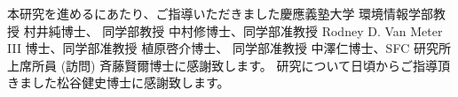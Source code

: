 \begin{acknowledgment}

本研究を進めるにあたり、ご指導いただきました慶應義塾大学 環境情報学部教授 村井純博士、
同学部教授 中村修博士、同学部准教授 Rodney D. Van Meter III 博士、同学部准教授 植原啓介博士、
同学部准教授 中澤仁博士、SFC 研究所 上席所員 (訪問) 斉藤賢爾博士に感謝致します。
研究について日頃からご指導頂きました松谷健史博士に感謝致します。

\end{acknowledgment}
